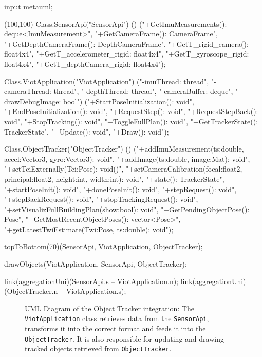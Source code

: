 \begin{empfile}[ObjectTrackerUML]
\begin{empcmds}
input metauml;
\end{empcmds}
\begin{empdef}[ObjectTrackerUML](100,100)
    Class.SensorApi("SensorApi")
           () 
            ("+GetImuMeasurements(): deque<ImuMeasurement>",
             "+GetCameraFrame(): CameraFrame",
             "+GetDepthCameraFrame(): DepthCameraFrame",
             "+GetT_rigid_camera(): float4x4",
             "+GetT_accelerometer_rigid: float4x4",
             "+GetT_gyroscope_rigid: float4x4",
             "+GetT_depthCamera_rigid: float4x4");
             
    Class.ViotApplication("ViotApplication")
            ("-imuThread: thread",
             "-cameraThread: thread",
             "-depthThread: thread",
             "-cameraBuffer: deque",
             "-drawDebugImage: bool")
            ("+StartPoseInitialization(): void",
             "+EndPoseInitialization(): void",
             "+RequestStep(): void",
             "+RequestStepBack(): void",
             "+StopTracking(): void",
             "+ToggleFullPlan(): void",
             "+GetTrackerState(): TrackerState",
             "+Update(): void",
             "+Draw(): void");
            
    Class.ObjectTracker("ObjectTracker")
            ()
            ("+addImuMeasurement(ts:double, accel:Vector3, gyro:Vector3): void",
             "+addImage(ts:double, image:Mat): void",
             "+setTciExternally(Tci:Pose): void()",
             "+setCameraCalibration(focal:float2, principal:float2, height:int, width:int): void",
             "+state(): TrackerState",
             "+startPoseInit(): void",
             "+donePoseInit(): void",
             "+stepRequest(): void",
             "+stepBackRequest(): void",
             "+stopTrackingRequest(): void",
             "+setVisualizFullBuildingPlan(show:bool): void",
             "+GetPendingObjectPose(): Pose",
             "+GetMostRecentObjectPoses(): vector<Pose>",
             "+getLatestTwiEstimate(Twi:Pose, ts:double): void");
    
    topToBottom(70)(SensorApi, ViotApplication, ObjectTracker);
    
    drawObjects(ViotApplication, SensorApi, ObjectTracker);
    
    link(aggregationUni)(SensorApi.s -- ViotApplication.n);
    link(aggregationUni)(ObjectTracker.n -- ViotApplication.s);
\end{empdef}
\end{empfile}
\begin{figure}
    \centering
    \caption[UML Diagram of the Object Tracker integration]{UML Diagram of the Object Tracker integration: The \lstinline{ViotApplication} class retrieves data from the \lstinline{SensorApi}, transforms it into the correct format and feeds it into the \lstinline{ObjectTracker}. It is also responsible for updating and drawing tracked objects retrieved from \lstinline{ObjectTracker}.
      \label{fig:ObjectTrackerUML}}
\end{figure}

